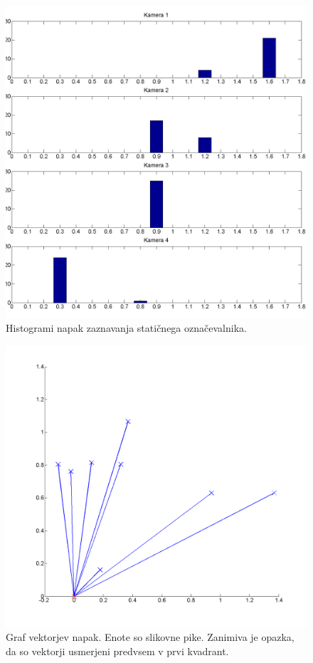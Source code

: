 \documentclass[a4paper, 12pt]{book}
\begin{document}
\begin{figure}[H]
\centering
\includegraphics[width=\textwidth,height=\textheight,keepaspectratio]{marker_detection_static_bar.png}
\caption{Histogrami napak zaznavanja statičnega označevalnika.}
\end{figure}

\begin{figure}[H]
\centering
\includegraphics[width=\textwidth,height=\textheight,keepaspectratio]{marker_detection_static_errors.png}
\caption{Graf vektorjev napak. Enote so slikovne pike. Zanimiva je opazka, da so vektorji usmerjeni predvsem v prvi kvadrant.}
\end{figure}
\end{document}
